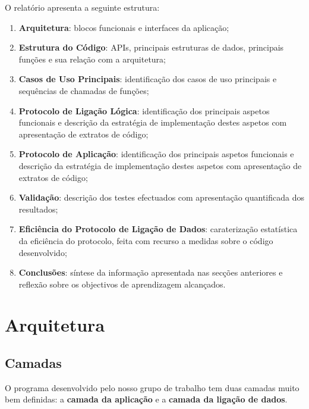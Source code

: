 \documentclass[article, a4paper, 11pt, oneside]{memoir}
\begin{document}
O relatório apresenta a seguinte estrutura:
\begin{enumerate}
    \item \textbf{Arquitetura}: blocos funcionais e interfaces da aplicação;
    \item \textbf{Estrutura do Código}: APIs, principais estruturas de dados, 
    principais funções e sua relação com a arquitetura;
    \item \textbf{Casos de Uso Principais}: identificação dos casos de uso principais
    e sequências de chamadas de funções;
    \item \textbf{Protocolo de Ligação Lógica}: identificação dos principais aspetos funcionais 
    e descrição da estratégia de implementação destes aspetos com apresentação de extratos de
    código;
    \item \textbf{Protocolo de Aplicação}: identificação dos principais aspetos funcionais 
    e descrição da estratégia de implementação destes aspetos com apresentação de extratos de
    código;
    \item \textbf{Validação}: descrição dos testes efectuados com apresentação quantificada 
    dos resultados;
    \item \textbf{Eficiência do Protocolo de Ligação de Dados}: caraterização estatística da 
    eficiência do protocolo, feita com recurso a medidas sobre o código desenvolvido;
    \item \textbf{Conclusões}: síntese da informação apresentada nas secções anteriores e 
    reflexão sobre os objectivos de aprendizagem alcançados.


\end{enumerate}

\chapter[Arquitetura][Arquitetura]{Arquitetura} \label{\thechapter}

\section{Camadas}

O programa desenvolvido pelo nosso grupo de trabalho tem duas camadas muito bem definidas:
a \textbf{camada da aplicação} e a \textbf{camada da ligação de dados}.
\end{document}
